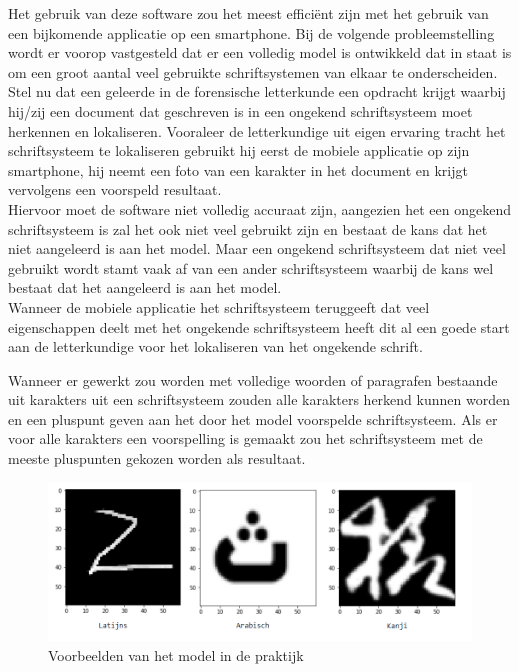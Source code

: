 Het gebruik van deze software zou het meest efficiënt zijn met het gebruik van een bijkomende applicatie op een smartphone.
Bij de volgende probleemstelling wordt er voorop vastgesteld dat er een volledig model is ontwikkeld dat in staat is om een groot aantal veel gebruikte schriftsystemen van elkaar te onderscheiden. \\
Stel nu dat een geleerde in de forensische letterkunde een opdracht krijgt waarbij hij/zij een document dat geschreven is in een ongekend schriftsysteem moet herkennen en lokaliseren. Vooraleer de letterkundige uit eigen ervaring tracht het schriftsysteem te lokaliseren gebruikt hij eerst de mobiele applicatie op zijn smartphone, hij neemt een foto van een karakter in het document en krijgt vervolgens een voorspeld resultaat. \\
Hiervoor moet de software niet volledig accuraat zijn, aangezien het een ongekend schriftsysteem is zal het ook niet veel gebruikt zijn en bestaat de kans dat het niet aangeleerd is aan het model.
Maar een ongekend schriftsysteem dat niet veel gebruikt wordt stamt vaak af van een ander schriftsysteem waarbij de kans wel bestaat dat het aangeleerd is aan het model. \\
Wanneer de mobiele applicatie het schriftsysteem teruggeeft dat veel eigenschappen deelt met het ongekende schriftsysteem heeft dit al een goede start aan de letterkundige voor het lokaliseren van het ongekende schrift.

Wanneer er gewerkt zou worden met volledige woorden of paragrafen bestaande uit karakters uit een schriftsysteem zouden alle karakters herkend kunnen worden en een pluspunt geven aan het door het model voorspelde schriftsysteem.
Als er voor alle karakters een voorspelling is gemaakt zou het schriftsysteem met de meeste pluspunten gekozen worden als resultaat.

 
\begin{figure}
    
    
    \includegraphics[width=\linewidth]{img/voorbeelden.png}
    \caption{Voorbeelden van het model in de praktijk}
    \label{tab:examples}

\end{figure}









 














